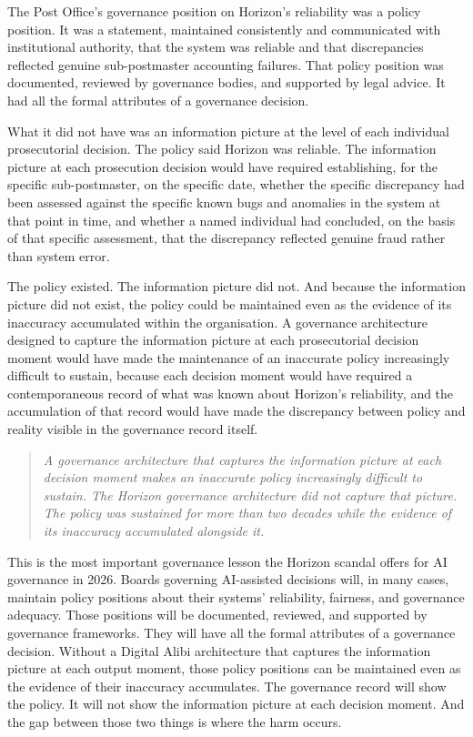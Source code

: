 The Post Office's governance position on Horizon's reliability was a policy position. It was a statement, maintained consistently and communicated with institutional authority, that the system was reliable and that discrepancies reflected genuine sub-postmaster accounting failures. That policy position was documented, reviewed by governance bodies, and supported by legal advice. It had all the formal attributes of a governance decision.

What it did not have was an information picture at the level of each individual prosecutorial decision. The policy said Horizon was reliable. The information picture at each prosecution decision would have required establishing, for the specific sub-postmaster, on the specific date, whether the specific discrepancy had been assessed against the specific known bugs and anomalies in the system at that point in time, and whether a named individual had concluded, on the basis of that specific assessment, that the discrepancy reflected genuine fraud rather than system error.

The policy existed. The information picture did not. And because the information picture did not exist, the policy could be maintained even as the evidence of its inaccuracy accumulated within the organisation. A governance architecture designed to capture the information picture at each prosecutorial decision moment would have made the maintenance of an inaccurate policy increasingly difficult to sustain, because each decision moment would have required a contemporaneous record of what was known about Horizon's reliability, and the accumulation of that record would have made the discrepancy between policy and reality visible in the governance record itself.

\begin{quote}
\emph{A governance architecture that captures the information picture at each decision moment makes an inaccurate policy increasingly difficult to sustain. The Horizon governance architecture did not capture that picture. The policy was sustained for more than two decades while the evidence of its inaccuracy accumulated alongside it.}
\end{quote}

This is the most important governance lesson the Horizon scandal offers for AI governance in 2026. Boards governing AI-assisted decisions will, in many cases, maintain policy positions about their systems' reliability, fairness, and governance adequacy. Those positions will be documented, reviewed, and supported by governance frameworks. They will have all the formal attributes of a governance decision. Without a Digital Alibi architecture that captures the information picture at each output moment, those policy positions can be maintained even as the evidence of their inaccuracy accumulates. The governance record will show the policy. It will not show the information picture at each decision moment. And the gap between those two things is where the harm occurs.

